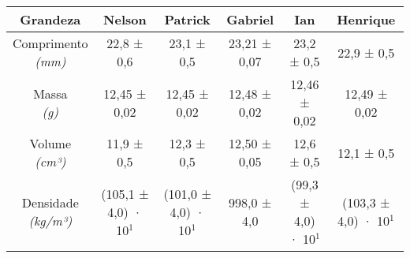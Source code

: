 \documentclass{article}
\begin{document}
\begin{table}[h!]
\centering
\begin{tabular}{c c c c c c }
\toprule
Grandeza & Nelson & Patrick & Gabriel & Ian & Henrique\\
\midrule
\shortstack{Comprimento\\\textit{(mm)}} & 22,8 ± 0,6 & 23,1 ± 0,5 & 23,21 ± 0,07 & 23,2 ± 0,5 & 22,9 ± 0,5\\[4pt]
\shortstack{Massa\\\textit{(g)}} & 12,45 ± 0,02 & 12,45 ± 0,02 & 12,48 ± 0,02 & 12,46 ± 0,02 & 12,49 ± 0,02\\[4pt]
\shortstack{Volume\\\textit{(cm³)}} & 11,9 ± 0,5 & 12,3 ± 0,5 & 12,50 ± 0,05 & 12,6 ± 0,5 & 12,1 ± 0,5\\[4pt]
\shortstack{Densidade\\\textit{(kg/m³)}} & (105,1 ± 4,0) · 10$^{1}$ & (101,0 ± 4,0) · 10$^{1}$ & 998,0 ± 4,0 & (99,3 ± 4,0) · 10$^{1}$ & (103,3 ± 4,0) · 10$^{1}$\\[4pt]
\bottomrule
\end{tabular}
\end{table}
\end{document}
